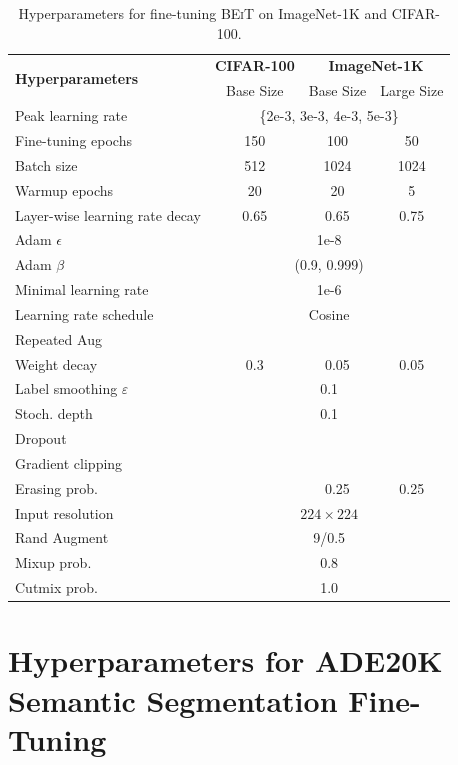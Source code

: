 \documentclass{article}
\newcommand{\cmark}{{\ding{51}}}%
\newcommand{\xmark}{{\ding{55}}}%
\newcommand\our{\textsc{BEiT}}
\begin{document}
\begin{table}[H]
\centering
\begin{tabular}{l|ccc}
\toprule
\multirow{2}{*}{\bf Hyperparameters} & \bf CIFAR-100 & \multicolumn{2}{c}{\bf ImageNet-1K} \\
& Base Size & Base Size & Large Size \\
\toprule
Peak learning rate & 
\multicolumn{3}{c}{\{2e-3, 3e-3, 4e-3, 5e-3\}} \\
Fine-tuning epochs & 150 & 100 & 50 \\
Batch size & 512 & 1024 & 1024 \\
Warmup epochs & 20 & 20 & 5 \\
Layer-wise learning rate decay & 0.65 & 0.65 & 0.75 \\
Adam $\epsilon$ & \multicolumn{3}{c}{1e-8}  \\
Adam $\beta$ & \multicolumn{3}{c}{(0.9, 0.999)} \\
Minimal learning rate & \multicolumn{3}{c}{1e-6} \\
Learning rate schedule & \multicolumn{3}{c}{Cosine} \\
\midrule
Repeated Aug & \cmark & \cmark & \xmark \\
Weight decay & 0.3 & 0.05 & 0.05 \\
Label smoothing $\varepsilon$ & \multicolumn{3}{c}{0.1}     \\
Stoch. depth & \multicolumn{3}{c}{0.1} \\
Dropout & \multicolumn{3}{c}{\xmark} \\
Gradient clipping & \multicolumn{3}{c}{\xmark} \\
\midrule
Erasing prob.  & \xmark & 0.25 & 0.25 \\
Input resolution & \multicolumn{3}{c}{$224 \times 224$} \\
Rand Augment  & \multicolumn{3}{c}{9/0.5} \\
Mixup prob.  & \multicolumn{3}{c}{0.8}     \\
Cutmix prob.   & \multicolumn{3}{c}{1.0}    \\
\bottomrule
\end{tabular}
\caption{
Hyperparameters for fine-tuning \our{} on ImageNet-1K and CIFAR-100.
}
\label{tbl:ft:imagenet:hyperparams}
\end{table}

\section{Hyperparameters for ADE20K Semantic Segmentation Fine-Tuning}
\label{app:finetune:seg}
\end{document}
